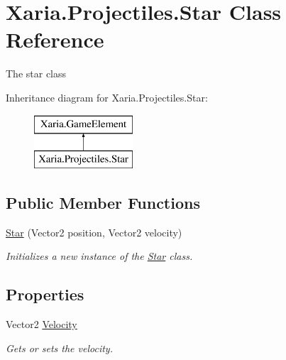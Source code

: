 \hypertarget{classXaria_1_1Projectiles_1_1Star}{}\section{Xaria.\+Projectiles.\+Star Class Reference}
\label{classXaria_1_1Projectiles_1_1Star}


The star class  


Inheritance diagram for Xaria.\+Projectiles.\+Star\+:\begin{figure}[H]
\begin{center}
\leavevmode
\includegraphics[height=2.000000cm]{classXaria_1_1Projectiles_1_1Star}
\end{center}
\end{figure}
\subsection*{Public Member Functions}
\begin{DoxyCompactItemize}
\item 
\hyperlink{classXaria_1_1Projectiles_1_1Star_a3dec66d134e721878d9a6c7207f7567b}{Star} (Vector2 position, Vector2 velocity)
\begin{DoxyCompactList}\small\item\em Initializes a new instance of the \hyperlink{classXaria_1_1Projectiles_1_1Star}{Star} class. \end{DoxyCompactList}\end{DoxyCompactItemize}
\subsection*{Properties}
\begin{DoxyCompactItemize}
\item 
Vector2 \hyperlink{classXaria_1_1Projectiles_1_1Star_ac6cc10e6c07eadfe3a2c44133105dd38}{Velocity}
\begin{DoxyCompactList}\small\item\em Gets or sets the velocity. \end{DoxyCompactList}\end{DoxyCompactItemize}


